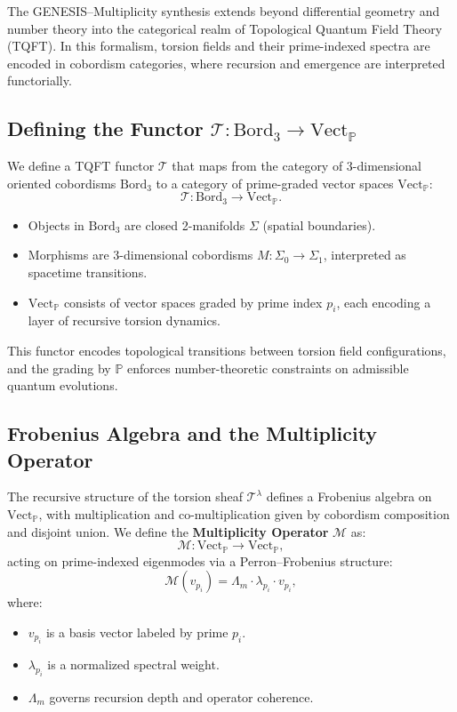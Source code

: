 \documentclass{article}
\theoremstyle{plain}
\begin{document}
The GENESIS–Multiplicity synthesis extends beyond differential geometry and number theory into the categorical realm of Topological Quantum Field Theory (TQFT). In this formalism, torsion fields and their prime-indexed spectra are encoded in cobordism categories, where recursion and emergence are interpreted functorially.

\subsection{Defining the Functor \texorpdfstring{$\mathcal{T}: \text{Bord}_3 \to \text{Vect}_{\mathbb{P}}$}{T: Bord3 → VectP}}

We define a TQFT functor $\mathcal{T}$ that maps from the category of 3-dimensional oriented cobordisms $\text{Bord}_3$ to a category of prime-graded vector spaces $\text{Vect}_{\mathbb{P}}$:
\[
\mathcal{T}: \text{Bord}_3 \rightarrow \text{Vect}_{\mathbb{P}}.
\]

\begin{itemize}
    \item Objects in $\text{Bord}_3$ are closed 2-manifolds $\Sigma$ (spatial boundaries).
    \item Morphisms are 3-dimensional cobordisms $M: \Sigma_0 \rightarrow \Sigma_1$, interpreted as spacetime transitions.
    \item $\text{Vect}_{\mathbb{P}}$ consists of vector spaces graded by prime index $p_i$, each encoding a layer of recursive torsion dynamics.
\end{itemize}

This functor encodes topological transitions between torsion field configurations, and the grading by $\mathbb{P}$ enforces number-theoretic constraints on admissible quantum evolutions.

\subsection{Frobenius Algebra and the Multiplicity Operator}

The recursive structure of the torsion sheaf $\mathcal{T}^\lambda$ defines a Frobenius algebra on $\text{Vect}_{\mathbb{P}}$, with multiplication and co-multiplication given by cobordism composition and disjoint union. We define the \textbf{Multiplicity Operator} $\mathcal{M}$ as:
\[
\mathcal{M}: \text{Vect}_{\mathbb{P}} \rightarrow \text{Vect}_{\mathbb{P}},
\]
acting on prime-indexed eigenmodes via a Perron–Frobenius structure:
\[
\mathcal{M}(v_{p_i}) = \Lambda_m \cdot \lambda_{p_i} \cdot v_{p_i},
\]
where:
\begin{itemize}
    \item $v_{p_i}$ is a basis vector labeled by prime $p_i$.
    \item $\lambda_{p_i}$ is a normalized spectral weight.
    \item $\Lambda_m$ governs recursion depth and operator coherence.
\end{itemize}
\end{document}
